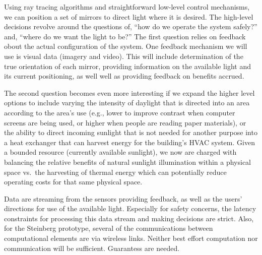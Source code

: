 Using ray tracing algorithms and straightforward low-level control mechanisms,
we can position a set of mirrors to direct light where it is desired. The
high-level decisions revolve around the questions of, ``how do we operate
the system safely?'' and, ``where do we want the light to be?''
The first question relies on feedback obout the actual configuration of the system.
One feedback mechanism we will use is visual data (imagery and video). This
will include determination of the true orientation of each mirror, providing information
on the available light and its current positioning, as well well as providing feedback
on benefits accrued.

The second question becomes even more interesting if we expand the
higher level options to include varying the intensity of daylight that is
directed into an area according to the area's use (e.g., lower to improve
contrast when computer screens are being used, or higher when people are
reading paper materials), or the ability to direct incoming sunlight that
is not needed for another purpose into a heat exchanger that can harvest
energy for the building's HVAC system.  Given a bounded resource
(currently available sunlight), we now are charged
with balancing the relative benefits of natural sunlight illumination within
a physical space vs.~the harvesting of thermal energy which can potentially
reduce operating costs for that same physical space.

Data are streaming from the sensors providing feedback, as well as the users'
directions for use of the available light.  Especially for safety concerns, the
latency constraints for processing this data stream and making decisions are
strict.  Also, for the Steinberg prototype, several of the communications
between computational elements are via wireless links.  Neither best effort computation
nor communication will be sufficient. Guarantess are needed.
